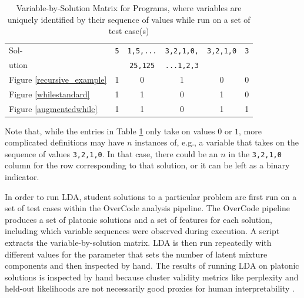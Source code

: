 \begin{table}[t]
\caption{Variable-by-Solution Matrix for Programs, where variables are uniquely identified by their sequence of values while run on a set of test case(s)}
\label{varbydocmat}
\begin{center}
\begin{small}
\begin{sc}
\begin{tabular}{| l | c | c | c | c | c |}
\hline
Sol- & \texttt{5} & \texttt{1,5,...} & \texttt{3,2,1,0,} & \texttt{3,2,1,0} & \texttt{3} \\
ution& & \texttt{25,125} & \texttt{...1,2,3} & &  \\
\hline
Figure \ref{recursive_example} & 1 & 0 & 1 & 0 & 0 \\
Figure \ref{whilestandard}     & 1 & 1 & 0 & 1 & 0 \\
Figure \ref{augmentedwhile}    & 1 & 1 & 0 & 1 & 1 \\
\hline
\end{tabular}
\end{sc}
\end{small}
\end{center}
\end{table}

Note that, while the entries in Table \ref{varbydocmat} only take on values $0$ or $1$, more complicated definitions may have $n$ instances of, e.g., a variable that takes on the sequence of values \texttt{3,2,1,0}. In that case, there could be an $n$ in the \texttt{3,2,1,0} column for the row corresponding to that solution, or it can be left as a binary indicator. %


In order to run LDA, student solutions to a particular problem are first run on a set of test cases within the OverCode analysis pipeline. The OverCode pipeline produces a set of platonic solutions and a set of features for each solution, including which variable sequences were observed during execution. A script extracts the variable-by-solution matrix. LDA is then run repeatedly with different values for the parameter that sets the number of latent mixture components and then inspected by hand. The results of running LDA on platonic solutions is inspected by hand because cluster validity metrics like perplexity and held-out likelihoods are not necessarily good proxies for human interpretability \cite{readingtealeaves}. 

